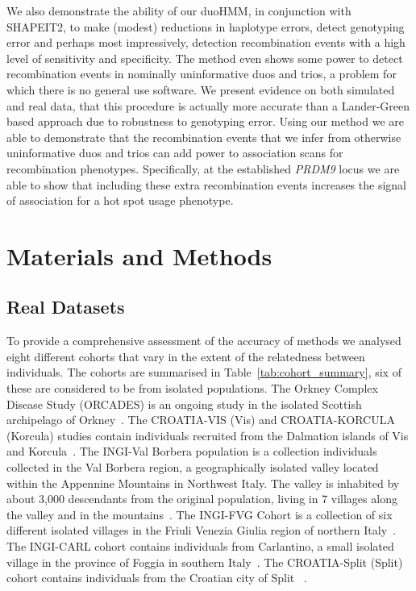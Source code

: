 We also demonstrate the ability of our duoHMM, in conjunction with SHAPEIT2, to make (modest) reductions in haplotype errors, detect genotyping error and perhaps most impressively, detection recombination events with a high level of sensitivity and specificity. The method even shows some power to detect recombination events in nominally uninformative duos and trios, a problem for which there is no general use software. We present evidence on both simulated and real data, that this procedure is actually more accurate than a Lander-Green based approach due to robustness to genotyping error. Using our method we are able to demonstrate that the recombination events that we infer from otherwise uninformative duos and trios can add power to association scans for recombination phenotypes. Specifically, at the established \emph{PRDM9} locus we are able to show that including these extra recombination events increases the signal of association for a hot spot usage phenotype.

\section{Materials and Methods}

\subsection{Real Datasets}

To provide a comprehensive assessment of the accuracy of methods we analysed eight different cohorts that vary in the extent of the relatedness between individuals. The cohorts are summarised in Table~\ref{tab:cohort_summary}, six of these are considered to be from isolated populations. The Orkney Complex Disease Study (ORCADES) is an ongoing study in the isolated Scottish archipelago of Orkney~\citep{mcquillan2008runs}. The CROATIA-VIS (Vis) and CROATIA-KORCULA (Korcula) studies contain individuals recruited from the Dalmation islands of Vis and Korcula~\citep{mcquillan2008runs,zemunik2009genome}. The INGI-Val Borbera population is a collection individuals collected in the Val Borbera region, a geographically isolated valley located within the Appennine Mountains in Northwest Italy. The valley is inhabited by about 3,000 descendants from the original population, living in 7 villages along the valley and in the mountains~\citep{traglia2009heritability}. The INGI-FVG Cohort is a collection of six different isolated villages in the Friuli Venezia Giulia region of northern Italy~\citep{esko2012genetic}. The INGI-CARL cohort contains individuals from Carlantino, a small isolated village in the province of Foggia in southern Italy~\citep{esko2012genetic}. The CROATIA-Split (Split) cohort contains individuals from the Croatian city of Split ~\citep{rudan200910}.  

